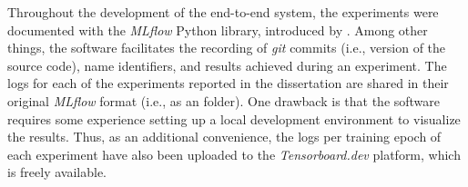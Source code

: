 
Throughout the development of the end-to-end system, the
experiments were documented with the \emph{MLflow} Python
library, introduced by \textcite{zaharia2018accelerating}.
Among other things, the software facilitates the recording
of \emph{git} commits
(i.e., version of the source code), name identifiers, and
results achieved during an experiment. The logs for each of
the experiments reported in the dissertation are shared in
their original \emph{MLflow} format (i.e., as an
 folder). One drawback is that the software
requires some experience setting up a local development
environment to visualize the results. Thus, as an additional
convenience, the logs per training epoch of each experiment
have also been uploaded to the
\emph{Tensorboard.dev}
platform, which is
freely available.
